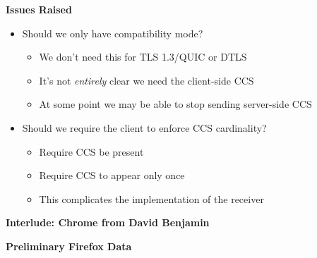 \documentclass[helvetica]{seminar}
\newcommand{\heading}[1]{%
  \begin{center} 
    \large\bf 
    #1 
  \end{center} 
  \vspace{.4 in}}
\begin{document}
\begin{slide}
  \heading{Issues Raised}

  \begin{itemize}
  \item Should we \textsf{only} have compatibility mode?
    \begin{itemize}
    \item We don't need this for TLS 1.3/QUIC or DTLS
    \item It's not \emph{entirely} clear we need the client-side CCS
    \item At some point we may be able to stop sending server-side CCS
    \end{itemize}

  \item Should we require the client to enforce CCS cardinality?
    \begin{itemize}
    \item Require CCS be present
    \item Require CCS to appear only once
    \item This complicates the implementation of the receiver
    \end{itemize}
  \end{itemize}
\end{slide}


\begin{slide}
\heading{Interlude: Chrome from David Benjamin}

\end{slide}

\begin{slide}
\heading{Preliminary Firefox Data}

\end{slide}
\end{document}
